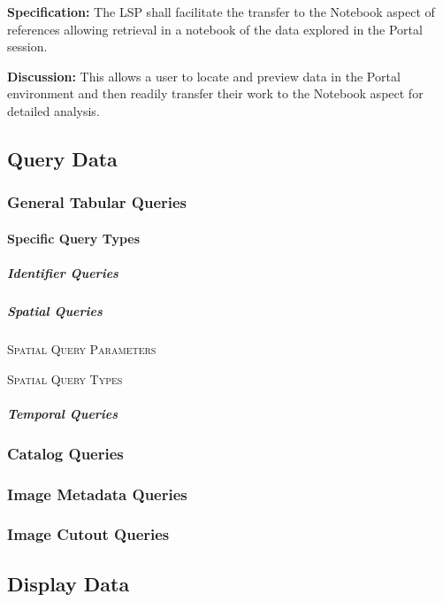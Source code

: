 \documentclass[SE,toc,lsstdraft]{lsstdoc}
\begin{document}
\textbf{Specification:}
The LSP shall facilitate the transfer to the Notebook aspect of references allowing retrieval in a notebook of the data explored in the Portal session.

\textbf{Discussion:}
This allows a user to locate and preview data in the Portal environment and then readily transfer their work to the Notebook aspect for detailed analysis.

\subsection{Query Data}

\subsubsection{General Tabular Queries}

\paragraph{Specific Query Types}\hfill  %

\subparagraph{Identifier Queries}\hfill  %

\subparagraph{Spatial Queries}\hfill  %

\textsc{Spatial Query Parameters}

\textsc{Spatial Query Types}

\subparagraph{Temporal Queries}\hfill  %

\subsubsection{Catalog Queries}

\subsubsection{Image Metadata Queries}

\subsubsection{Image Cutout Queries}

\subsection{Display Data}
\end{document}
